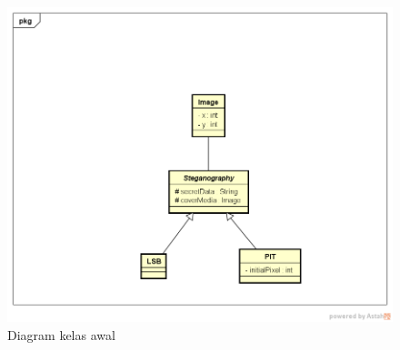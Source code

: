 \documentclass[a4paper,twoside]{article}
\begin{document}
\begin{enumerate}
		\begin{figure}[!htbp]
		\centering
		\includegraphics[scale=0.4]{ClassDiagram.png}
		\caption{Diagram kelas awal}
		\label{imageClassDiagram}
		\end{figure}
		

\end{enumerate}
\end{document}
